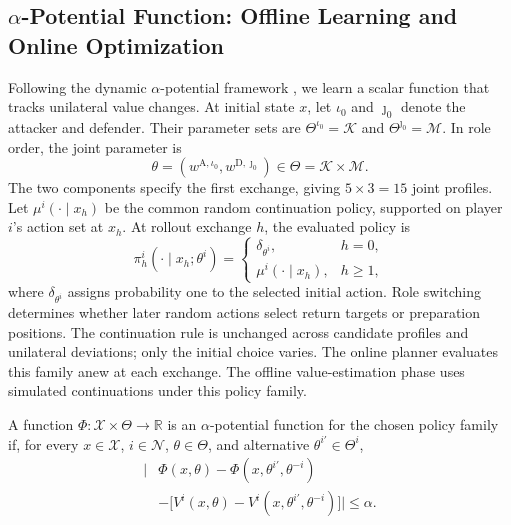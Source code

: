 \documentclass[pmlr]{jmlr}
\newcommand{\Players}{\mathcal{N}}
\newcommand{\States}{\mathcal{X}}
\newcommand{\R}{\mathbb{R}}
\newcommand{\attack}{\mathrm{A}}
\newcommand{\defend}{\mathrm{D}}
\begin{document}
\subsection{$\alpha$-Potential Function: Offline Learning and Online Optimization}
\label{sec:potential}

Following the dynamic $\alpha$-potential framework \citep{guo2023markov,guo2024dynamic,kalaria2025racer}, we learn a scalar function that tracks unilateral value changes. At initial state $x$, let $\iota_0$ and $\jmath_0$ denote the attacker and defender. Their parameter sets are $\Theta^{\iota_0}=\mathcal{K}$ and $\Theta^{\jmath_0}=\mathcal{M}$. In role order, the joint parameter is
\begin{equation}
  \theta=(w^{\attack,\iota_0},w^{\defend,\jmath_0})
  \in\Theta=\mathcal{K}\times\mathcal{M}.
  \label{eq:compacttheta}
\end{equation}
The two components specify the first exchange, giving $5\times3=15$ joint profiles. Let $\mu^i(\cdot\mid x_h)$ be the common random continuation policy, supported on player $i$'s action set at $x_h$. At rollout exchange $h$, the evaluated policy is
\begin{equation}
  \pi_h^i(\cdot\mid x_h;\theta^i)=
  \begin{cases}
    \delta_{\theta^i}, & h=0,\\
    \mu^i(\cdot\mid x_h), & h\geq1,
  \end{cases}
  \label{eq:firstexchangepolicy}
\end{equation}
where $\delta_{\theta^i}$ assigns probability one to the selected initial action. Role switching determines whether later random actions select return targets or preparation positions. The continuation rule is unchanged across candidate profiles and unilateral deviations; only the initial choice varies. The online planner evaluates this family anew at each exchange. The offline value-estimation phase uses simulated continuations under this policy family.

\begin{definition}
A function $\Phi:\States\times\Theta\to\R$ is an $\alpha$-potential function for the chosen policy family if, for every $x\in\States$, $i\in\Players$, $\theta\in\Theta$, and alternative $\theta^{i\prime}\in\Theta^i$,
\begin{equation}
\begin{split}
  \big|&\Phi(x,\theta)-\Phi(x,\theta^{i\prime},\theta^{-i})\\
       &-\big[V^i(x,\theta)-V^i(x,\theta^{i\prime},\theta^{-i})\big]\big|
  \leq\alpha.
\end{split}
  \label{eq:alphapotential}
\end{equation}
\end{definition}
\end{document}
